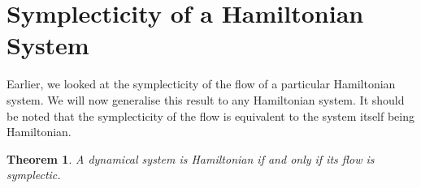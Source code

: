 \documentclass{report}
\newtheorem{theorem}{Theorem}[subsection]
\theoremstyle{exampstyle} \newtheorem{example}[theorem]{Example}
\theoremstyle{exampstyle} \newtheorem{remark}[theorem]{Remark}
\theoremstyle{exampstyle} \newtheorem{definition}[theorem]{Definition}
\theoremstyle{exampstyle} \newtheorem{lemma}[theorem]{Lemma}
\begin{document}




\section{Symplecticity of a Hamiltonian System}

Earlier, we looked at the symplecticity of the flow of a particular Hamiltonian system.
We will now generalise this result to any Hamiltonian system.
It should be noted that the symplecticity of the flow is equivalent to the system itself being Hamiltonian.

\begin{theorem}
	A dynamical system is Hamiltonian if and only if its flow is symplectic.
\end{theorem}
\end{document}
